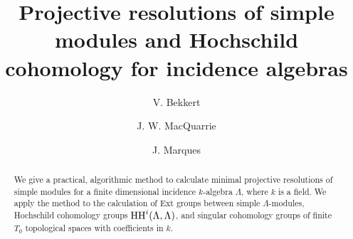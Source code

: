 \documentclass[preprint,review,12pt]{elsarticle}
\newcommand{\HH}{{\textnormal{HH}}}
\begin{document}
\begin{frontmatter}



\title{Projective resolutions of simple modules and Hochschild cohomology for incidence algebras} %

 \author{V. Bekkert}

\author{J. W. MacQuarrie}
 

\author{J. Marques} %



\begin{abstract}
We give a practical, algorithmic method to calculate minimal projective resolutions of simple modules for a finite dimensional incidence $k$-algebra $\Lambda$, where $k$ is a field.  We apply the method to the calculation of Ext groups between simple $\Lambda$-modules, Hochschild cohomology groups $\HH^i(\Lambda, \Lambda)$, and singular cohomology groups of finite $T_0$ topological spaces with coefficients in $k$.
\end{abstract}


\end{frontmatter}
\end{document}

